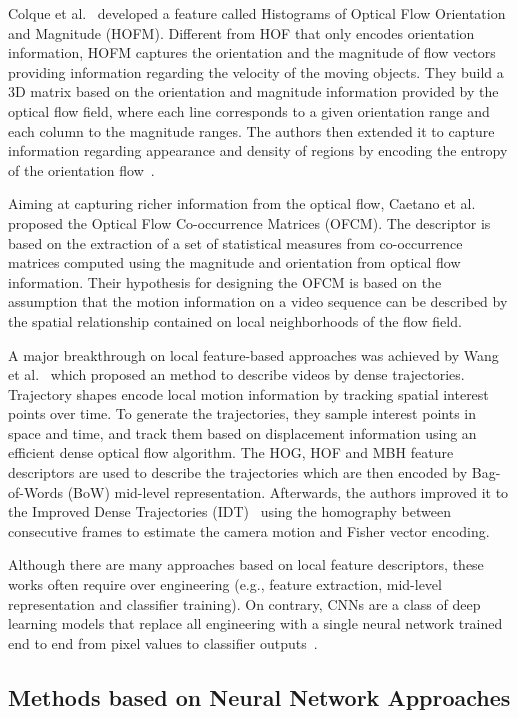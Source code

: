 \documentclass[10pt,conference]{IEEEtran}
\begin{document}
Colque et al.~\cite{Colque:2015} developed a feature called Histograms of Optical Flow Orientation and Magnitude (HOFM). Different from HOF that only encodes orientation information, HOFM captures the orientation and the magnitude of flow vectors providing information regarding the velocity of the moving objects. They build a 3D matrix based on the orientation and magnitude information provided by the optical flow field, where each line corresponds to a given orientation range and each column to the magnitude ranges. The authors then extended it to capture information regarding  appearance and density of regions by encoding the entropy of the orientation flow~\cite{Colque:2017}.

Aiming at capturing richer information from the optical flow, Caetano et al.~\cite{Caetano:2016} proposed the Optical Flow Co-occurrence Matrices (OFCM). The descriptor is based on the extraction of a set of statistical measures from co-occurrence matrices computed using the magnitude and orientation from optical flow information. Their hypothesis for designing the OFCM is based on the assumption that the motion information on a video sequence can be described by the spatial relationship contained on local neighborhoods of the flow field.

A major breakthrough on local feature-based approaches was achieved by Wang et al.~\cite{Wang:2011} which proposed an method to describe videos by dense trajectories. Trajectory shapes encode local motion information by tracking spatial interest points over time. To generate the trajectories, they sample interest points in space and time, and track them based on displacement information using an efficient dense optical flow algorithm. The HOG, HOF and MBH feature descriptors are used to describe the trajectories which are then encoded by Bag-of-Words (BoW) mid-level representation. Afterwards, the authors improved it to the Improved Dense Trajectories (IDT)~\cite{Wang:2013} using the homography between consecutive frames to estimate the camera motion and Fisher vector encoding. 


Although there are many approaches based on local feature descriptors, these works often require over engineering (e.g., feature extraction, mid-level representation and classifier training). On contrary, CNNs are a class of deep learning models that replace all engineering with a single neural network trained end to end from pixel values to classifier outputs~\cite{Karpathy:2014}.

\subsection{Methods based on Neural Network Approaches}\label{deeplearning}
\end{document}
